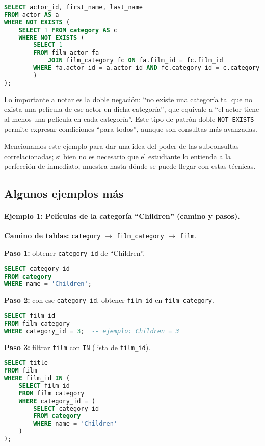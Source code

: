 \documentclass[12pt,a4paper]{article}
\begin{document}
\begin{lstlisting}[language=SQL]
SELECT actor_id, first_name, last_name
FROM actor AS a
WHERE NOT EXISTS (
	SELECT 1 FROM category AS c
	WHERE NOT EXISTS (
		SELECT 1 
		FROM film_actor fa
			JOIN film_category fc ON fa.film_id = fc.film_id
		WHERE fa.actor_id = a.actor_id AND fc.category_id = c.category_id
		)
);
\end{lstlisting}


Lo importante a notar es la doble negación: “no existe una categoría tal que no exista una película de ese actor en dicha categoría”, que equivale a “el actor tiene al menos una película en cada categoría”.
%
Este tipo de patrón doble \texttt{NOT EXISTS} permite expresar condiciones “para todos”, aunque son consultas más avanzadas.


Mencionamos este ejemplo para dar una idea del poder de las subconsultas correlacionadas; si bien no es necesario que el estudiante lo entienda a la perfección de inmediato, muestra hasta dónde se puede llegar con estas técnicas. 

\subsection{Algunos ejemplos más}

\paragraph{Ejemplo 1: Películas de la categoría ``Children'' (camino y pasos).}
\textbf{Camino de tablas:} \texttt{category} $\rightarrow$ \texttt{film\_category} $\rightarrow$ \texttt{film}.

\textbf{Paso 1:} obtener \texttt{category\_id} de ``Children''.
\begin{lstlisting}[language=SQL]
SELECT category_id 
FROM category 
WHERE name = 'Children';
\end{lstlisting}

\textbf{Paso 2:} con ese \texttt{category\_id}, obtener \texttt{film\_id} en \texttt{film\_category}.
\begin{lstlisting}[language=SQL]
SELECT film_id 
FROM film_category 
WHERE category_id = 3;  -- ejemplo: Children = 3
\end{lstlisting}

\textbf{Paso 3:} filtrar \texttt{film} con \texttt{IN} (lista de \texttt{film\_id}).
\begin{lstlisting}[language=SQL]
SELECT title 
FROM film
WHERE film_id IN (
    SELECT film_id 
    FROM film_category 
    WHERE category_id = (
        SELECT category_id 
        FROM category 
        WHERE name = 'Children'
    )
);
\end{lstlisting}
\end{document}
